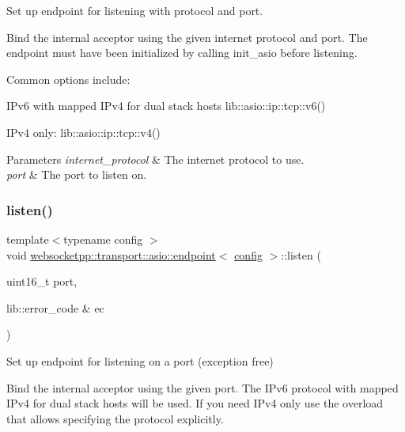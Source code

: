 Set up endpoint for listening with protocol and port. 

Bind the internal acceptor using the given internet protocol and port. The endpoint must have been initialized by calling init\+\_\+asio before listening.

Common options include\+:
\begin{DoxyItemize}
\item I\+Pv6 with mapped I\+Pv4 for dual stack hosts lib\+::asio\+::ip\+::tcp\+::v6()
\item I\+Pv4 only\+: lib\+::asio\+::ip\+::tcp\+::v4()
\end{DoxyItemize}


\begin{DoxyParams}{Parameters}
{\em internet\+\_\+protocol} & The internet protocol to use. \\
\hline
{\em port} & The port to listen on. \\
\hline
\end{DoxyParams}
\mbox{\label{classwebsocketpp_1_1transport_1_1asio_1_1endpoint_ae7da6e2c944c3e1a087495b9d998dc8b}} 
\subsubsection{\texorpdfstring{listen()}{listen()}\hspace{0.1cm}{\footnotesize\ttfamily [5/8]}}
{\footnotesize\ttfamily template$<$typename config $>$ \\
void \mbox{\hyperlink{classwebsocketpp_1_1transport_1_1asio_1_1endpoint}{websocketpp\+::transport\+::asio\+::endpoint}}$<$ \mbox{\hyperlink{classconfig}{config}} $>$\+::listen (\begin{DoxyParamCaption}\item[{uint16\+\_\+t}]{port,  }\item[{lib\+::error\+\_\+code \&}]{ec }\end{DoxyParamCaption})\hspace{0.3cm}{\ttfamily [inline]}}



Set up endpoint for listening on a port (exception free) 

Bind the internal acceptor using the given port. The I\+Pv6 protocol with mapped I\+Pv4 for dual stack hosts will be used. If you need I\+Pv4 only use the overload that allows specifying the protocol explicitly.

